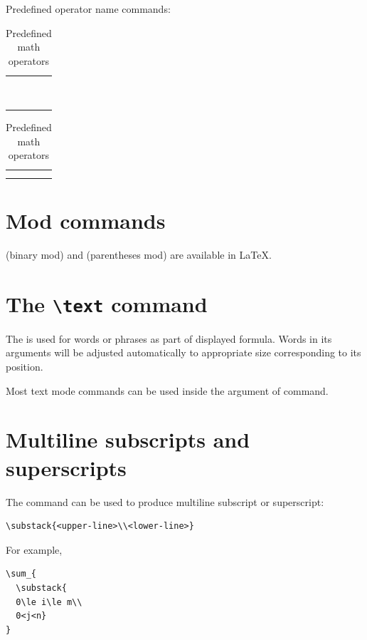 \documentclass[a4paper,oneside]{book}
\newcommand{\command}[1]{\PVerb{#1}}
\begin{document}
Predefined operator name commands:
\begin{table}[htpb]
  \centering
  \begin{tabular}{llll}
    \command{\arccos}&\command{\cosh}&\command{\deg}&\command{\dim}\\
    \command{\arcsin}&\command{\sinh}&\command{\det}&\command{\inf}\\
    \command{\arctan}&\command{\tanh}&\command{\min}&\command{\sup}\\
    \command{\cos}&\command{\coth}&\command{\max}&\command{\ln}\\
    \command{\sin}&\command{\lim}&\command{\exp}&\command{\log}\\
    \command{\tan}&\command{\injlim}&\command{\gcd}&\command{\Pr}\\
    \command{\cot}&\command{\limsup}&\command{\hom}&\command{\lg}\\
    \command{\sec}&\command{\liminf}&\command{\ker}\\
    \command{\csc}&\command{\projlim}&\command{\arg}
  \end{tabular}
  
  \medskip

  \begin{tabular}{ll}
    \command{\varlimsup}&\command{\varinjlim}\\
    \command{\varliminf}&\command{\varprojlim}
  \end{tabular}
  \caption{Predefined math operators}
\end{table}

\section{Mod commands}
\command{\bmod} (binary mod) and \command{\pmod} (parentheses mod) are available in \LaTeX{}.

\section{The \texttt{\textbackslash text} command}
The \command{\text} is used for words or phrases as part of displayed formula. Words in its arguments will be adjusted automatically to appropriate size corresponding to its position.

Most text mode commands can be used inside the argument of \command{\text} command.

\section{Multiline subscripts and superscripts}
The \command{\substack} command can be used to produce multiline subscript or superscript:
\begin{lstlisting}
\substack{<upper-line>\\<lower-line>}
\end{lstlisting}
For example,
\begin{lstlisting}[deletecomment={[s]{<}{>}}]
\sum_{
  \substack{
  0\le i\le m\\
  0<j<n}
}
\end{lstlisting}
\end{document}
